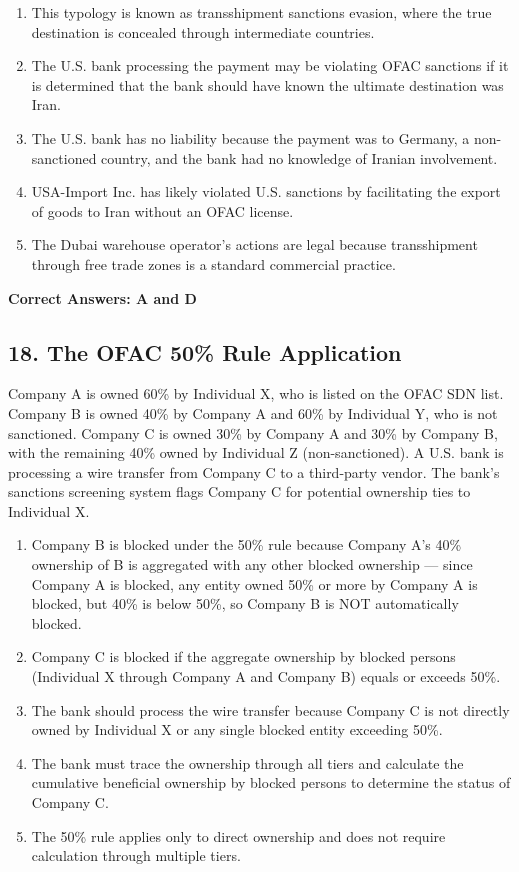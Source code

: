 \documentclass[11pt,a4paper]{article}
\begin{document}
	\begin{enumerate}[label=\Alph*.]
		\item This typology is known as transshipment sanctions evasion, where the true destination is concealed through intermediate countries.
		\item The U.S. bank processing the payment may be violating OFAC sanctions if it is determined that the bank should have known the ultimate destination was Iran.
		\item The U.S. bank has no liability because the payment was to Germany, a non-sanctioned country, and the bank had no knowledge of Iranian involvement.
		\item USA-Import Inc. has likely violated U.S. sanctions by facilitating the export of goods to Iran without an OFAC license.
		\item The Dubai warehouse operator's actions are legal because transshipment through free trade zones is a standard commercial practice.
	\end{enumerate}
	
	\textbf{Correct Answers: A and D}
	
	\subsection{18. The OFAC 50\% Rule Application}
	
	Company A is owned 60\% by Individual X, who is listed on the OFAC SDN list. Company B is owned 40\% by Company A and 60\% by Individual Y, who is not sanctioned. Company C is owned 30\% by Company A and 30\% by Company B, with the remaining 40\% owned by Individual Z (non-sanctioned). A U.S. bank is processing a wire transfer from Company C to a third-party vendor. The bank's sanctions screening system flags Company C for potential ownership ties to Individual X.
	
	\begin{enumerate}[label=\Alph*.]
		\item Company B is blocked under the 50\% rule because Company A's 40\% ownership of B is aggregated with any other blocked ownership — since Company A is blocked, any entity owned 50\% or more by Company A is blocked, but 40\% is below 50\%, so Company B is NOT automatically blocked.
		\item Company C is blocked if the aggregate ownership by blocked persons (Individual X through Company A and Company B) equals or exceeds 50\%.
		\item The bank should process the wire transfer because Company C is not directly owned by Individual X or any single blocked entity exceeding 50\%.
		\item The bank must trace the ownership through all tiers and calculate the cumulative beneficial ownership by blocked persons to determine the status of Company C.
		\item The 50\% rule applies only to direct ownership and does not require calculation through multiple tiers.
	\end{enumerate}
	
\end{document}
